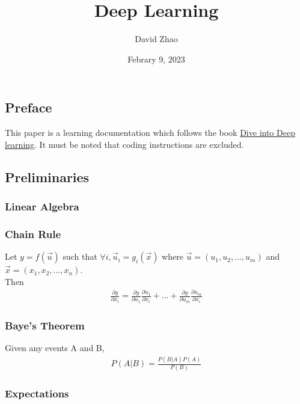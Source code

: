 \documentclass[a4paper,12pt]{article}
\theoremstyle{definition}
\begin{document}
\title{Deep Learning}
\author{David Zhao}
\date{Febrary 9, 2023}
\maketitle

\subsection*{Preface}
This paper is a learning documentation which follows the book \href{https://d2l.ai/}{Dive into Deep learning}.
It must be noted that coding instructions are excluded.
\subsection*{Preliminaries}
    \subsubsection*{Linear Algebra}

    \subsubsection*{Chain Rule}
    Let $y = f(\vec{u})$ such that $\forall i, \vec{u}_i = g_i(\vec{x})$ where $\vec{u} = (u_1, u_2, \ldots, u_m)$ and $\vec{x} = (x_1, x_2, \ldots, x_n)$. \\
    Then
    \begin{equation}
        \begin{aligned}
            \frac{\partial y}{\partial x_i} = \frac{\partial y}{\partial u_1}\frac{\partial u_1}{\partial x_i} + \ldots + \frac{\partial y}{\partial u_m}\frac{\partial u_m}{\partial x_i} 
        \end{aligned}
    \end{equation}

    \subsubsection*{Baye's Theorem}
    Given any events A and B, 
    \begin{equation}
        \begin{aligned}
            P(A|B) = \frac{P(B|A)P(A)}{P(B)}
        \end{aligned}
    \end{equation}

    \subsubsection*{Expectations}
\end{document}
